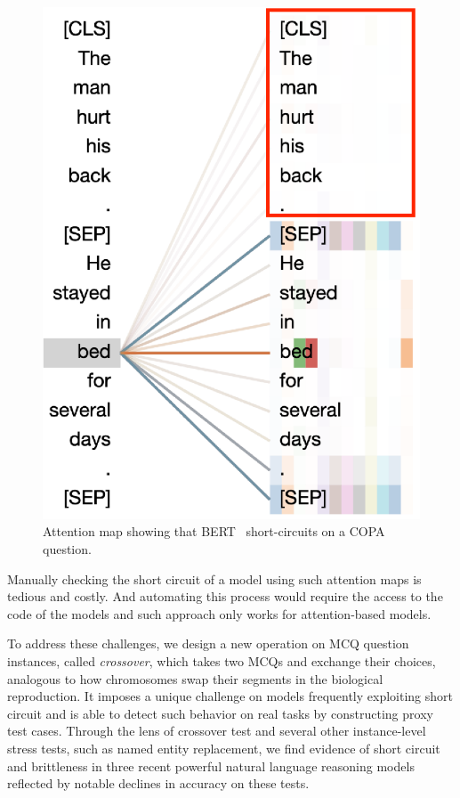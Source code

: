 \begin{figure}[th!]
\centering
\includegraphics[width=0.6\columnwidth]{figure/end_related.eps}
\caption{Attention map showing that BERT~\cite{devlin2018bert} 
short-circuits on a COPA question.}
\label{fig:att-goodex}
\end{figure}


%

Manually checking the short circuit of a model using such attention maps
is tedious and costly. And automating this process would require the access to 
the code of the models and such approach only works for 
attention-based models.

To address these challenges, we design a new operation on 
MCQ question instances, called \textit{crossover},
which takes two MCQs and exchange their
choices, analogous to how chromosomes swap their segments in
the biological reproduction. It imposes a unique challenge on models  
frequently exploiting short circuit and is able to detect such behavior 
on real tasks by constructing proxy test cases. 
Through the lens of crossover test and  
several other instance-level stress tests, such as named entity replacement, 
we find evidence of short circuit and brittleness in three recent powerful natural language
reasoning models reflected by notable declines in accuracy on these tests.

